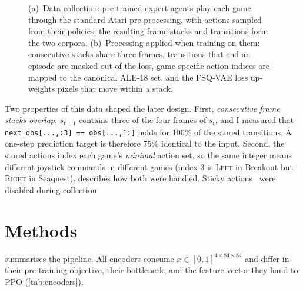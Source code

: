 \documentclass[runningheads]{llncs}
\begin{document}
\begin{figure}[t]
\centering

\caption{(a)~Data collection: pre-trained expert agents play each game through the
standard Atari pre-processing, with actions sampled from their policies; the resulting
frame stacks and transitions form the two corpora. (b)~Processing applied when training
on them: consecutive stacks share three frames, transitions that end an episode are
masked out of the loss, game-specific action indices are mapped to the canonical ALE-18
set, and the FSQ-VAE loss up-weights pixels that move within a stack.}
\label{fig:data}
\end{figure}

Two properties of this data shaped the later design. First, \emph{consecutive frame
stacks overlap}: $s_{t+1}$ contains three of the four frames of $s_t$, and I measured
that \texttt{next\_obs[...,:3] == obs[...,1:]} holds for 100\% of the stored
transitions. A one-step prediction target is therefore 75\% identical to the input.
Second, the stored actions index each game's \emph{minimal} action set, so the same
integer means different joystick commands in different games (index 3 is
\textsc{Left} in Breakout but \textsc{Right} in Seaquest).  describes how
both were handled. Sticky actions~\cite{machado2018revisiting} were disabled during
collection.

\section{Methods}
\label{sec:methods}

 summarises the pipeline. All encoders consume
$x\in[0,1]^{4\times84\times84}$ and differ in their pre-training objective, their
bottleneck, and the feature vector they hand to PPO (\cref{tab:encoders}).
\end{document}
